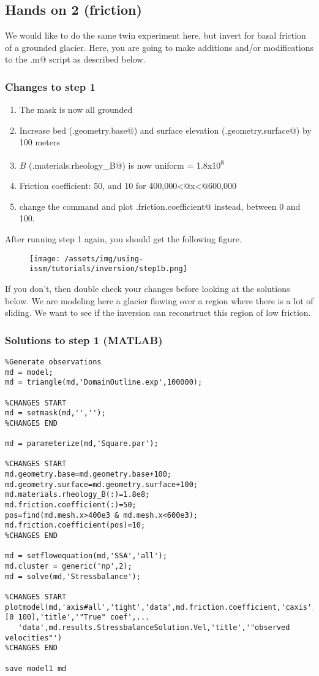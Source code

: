 \subsection{Hands on 2 (friction)} %
We would like to do the same twin experiment here, but invert for basal friction of a grounded glacier. Here, you are going to make additions and/or modifications to the \verb@runme.m@ script as described below.

\subsubsection{Changes to step 1}
\begin{enumerate}
	\item The mask is now all grounded
	\item Increase bed (\verb@md.geometry.base@) and surface elevation (\verb@md.geometry.surface@) by 100 meters
	\item $B$ (\verb@md.materials.rheology_B@) is now uniform = 1.8x10\textsuperscript{8}
	\item Friction coefficient: 50, and 10 for 400,000\verb@<@x\verb@<@600,000
	\item change the \verb@plotmodel@ command and plot \verb@md.friction.coefficient@ instead, between 0 and 100.
\end{enumerate}
After running step 1 again, you should get the following figure.
\begin{figure}[H]
	\begin{center}
		\texttt{[image: /assets/img/using-issm/tutorials/inversion/step1b.png]}
	\end{center}
\end{figure}
If you don't, then double check your changes before looking at the solutions below. We are modeling here a glacier flowing over a region where there is a lot of sliding. We want to see if the inversion can reconstruct this region of low friction.

\subsubsection{Solutions to step 1 (MATLAB)}
\begin{verbatim}%Generate observations
md = model;
md = triangle(md,'DomainOutline.exp',100000);

%CHANGES START
md = setmask(md,'','');
%CHANGES END

md = parameterize(md,'Square.par');

%CHANGES START
md.geometry.base=md.geometry.base+100;
md.geometry.surface=md.geometry.surface+100;
md.materials.rheology_B(:)=1.8e8;
md.friction.coefficient(:)=50;
pos=find(md.mesh.x>400e3 & md.mesh.x<600e3);
md.friction.coefficient(pos)=10;
%CHANGES END

md = setflowequation(md,'SSA','all');
md.cluster = generic('np',2);
md = solve(md,'Stressbalance');

%CHANGES START
plotmodel(md,'axis#all','tight','data',md.friction.coefficient,'caxis',[0 100],'title','"True" coef',...
   'data',md.results.StressbalanceSolution.Vel,'title','"observed velocities"')
%CHANGES END

save model1 md\end{verbatim}

